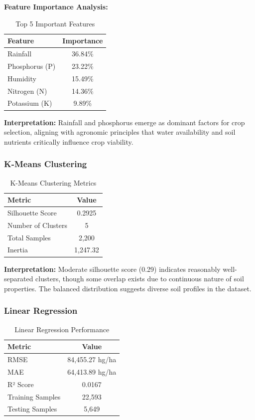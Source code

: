 \documentclass[conference]{IEEEtran}
\begin{document}
\textbf{Feature Importance Analysis:}
\begin{table}[h]
\centering
\caption{Top 5 Important Features}
\begin{tabular}{@{}lc@{}}
\toprule
\textbf{Feature} & \textbf{Importance} \\ \midrule
Rainfall & 36.84\% \\
Phosphorus (P) & 23.22\% \\
Humidity & 15.49\% \\
Nitrogen (N) & 14.36\% \\
Potassium (K) & 9.89\% \\ \bottomrule
\end{tabular}
\label{tab:feature_importance}
\end{table}

\textbf{Interpretation:} Rainfall and phosphorus emerge as dominant factors for crop selection, aligning with agronomic principles that water availability and soil nutrients critically influence crop viability.

\subsubsection{K-Means Clustering}
\begin{table}[h]
\centering
\caption{K-Means Clustering Metrics}
\begin{tabular}{@{}lc@{}}
\toprule
\textbf{Metric} & \textbf{Value} \\ \midrule
Silhouette Score & 0.2925 \\
Number of Clusters & 5 \\
Total Samples & 2,200 \\
Inertia & 1,247.32 \\ \bottomrule
\end{tabular}
\label{tab:kmeans_metrics}
\end{table}

\textbf{Interpretation:} Moderate silhouette score (0.29) indicates reasonably well-separated clusters, though some overlap exists due to continuous nature of soil properties. The balanced distribution suggests diverse soil profiles in the dataset.

\subsubsection{Linear Regression}
\begin{table}[h]
\centering
\caption{Linear Regression Performance}
\begin{tabular}{@{}lc@{}}
\toprule
\textbf{Metric} & \textbf{Value} \\ \midrule
RMSE & 84,455.27 hg/ha \\
MAE & 64,413.89 hg/ha \\
R² Score & 0.0167 \\
Training Samples & 22,593 \\
Testing Samples & 5,649 \\ \bottomrule
\end{tabular}
\label{tab:lr_metrics}
\end{table}
\end{document}
